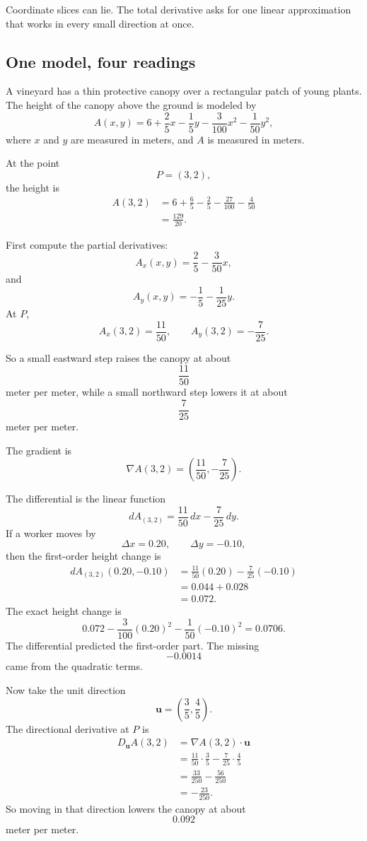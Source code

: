 Coordinate slices can lie.  The total derivative asks for one linear approximation that
works in every small direction at once.

\subsection*{One model, four readings}

A vineyard has a thin protective canopy over a rectangular patch of young plants.  The
height of the canopy above the ground is modeled by
\[
    A(x,y)
    =
    6+\frac25x-\frac15y-\frac{3}{100}x^2-\frac1{50}y^2,
\]
where \(x\) and \(y\) are measured in meters, and \(A\) is measured in meters.

At the point
\[
    P=(3,2),
\]
the height is
\[
\begin{aligned}
    A(3,2)
    &=
    6+\frac65-\frac25-\frac{27}{100}-\frac4{50}  \\
    &=
    \frac{129}{20}.
\end{aligned}
\]

First compute the partial derivatives:
\[
    A_x(x,y)=\frac25-\frac{3}{50}x,
\]
and
\[
    A_y(x,y)=-\frac15-\frac1{25}y.
\]
At \(P\),
\[
    A_x(3,2)=\frac{11}{50},
    \qquad
    A_y(3,2)=-\frac7{25}.
\]

So a small eastward step raises the canopy at about
\[
    \frac{11}{50}
\]
meter per meter, while a small northward step lowers it at about
\[
    \frac7{25}
\]
meter per meter.

The gradient is
\[
    \nabla A(3,2)=\left(\frac{11}{50},-\frac7{25}\right).
\]

The differential is the linear function
\[
\boxed{
    dA_{(3,2)}=
    \frac{11}{50}\,dx-\frac7{25}\,dy.
}
\]
If a worker moves by
\[
    \Delta x=0.20,
    \qquad
    \Delta y=-0.10,
\]
then the first-order height change is
\[
\begin{aligned}
    dA_{(3,2)}(0.20,-0.10)
    &=
    \frac{11}{50}(0.20)-\frac7{25}(-0.10)\\
    &=
    0.044+0.028\\
    &=
    0.072.
\end{aligned}
\]
The exact height change is
\[
    0.072-\frac{3}{100}(0.20)^2-\frac1{50}(-0.10)^2
    =
    0.0706.
\]
The differential predicted the first-order part.  The missing
\[
    -0.0014
\]
came from the quadratic terms.

Now take the unit direction
\[
    \mathbf u=\left(\frac35,\frac45\right).
\]
The directional derivative at \(P\) is
\[
\begin{aligned}
    D_{\mathbf u}A(3,2)
    &=
    \nabla A(3,2)\cdot \mathbf u\\
    &=
    \frac{11}{50}\cdot\frac35
    -
    \frac7{25}\cdot\frac45\\
    &=
    \frac{33}{250}-\frac{56}{250}\\
    &=
    -\frac{23}{250}.
\end{aligned}
\]
So moving in that direction lowers the canopy at about
\[
    0.092
\]
meter per meter.

